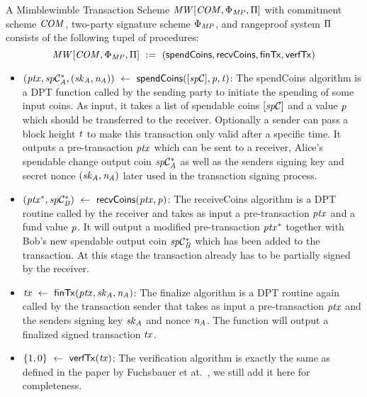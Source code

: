\begin{definition}
    \label{def:atom:mw-tx-scheme}
    A Mimblewimble Transaction Scheme $\mathit{MW}[\mathit{COM},\Phi_{\mathit{MP}},\Pi]$ with commitment scheme $\mathit{COM}$, two-party signature scheme $\Phi_{\mathit{MP}}$, and rangeproof system $\Pi$ consists of the following tupel of procedures:
    \[ \mathit{MW}[\mathit{COM},\Phi_{\mathit{MP}},\Pi] ~:=~ ( \mathsf{spendCoins},\mathsf{recvCoins},\mathsf{finTx},\mathsf{verfTx} ) \]
    \begin{itemize}
        \item $(\mathit{ptx}, \mathit{sp}\mathcal{C}_{\mathit{A}}^*, (\mathit{sk}_{\mathit{A}}, \mathit{\mathit{n}_{\mathit{A}}})) ~\leftarrow~ \mathsf{spendCoins}([\mathit{sp}\mathcal{C}],\mathit{p},\mathit{t})$: The spendCoins algorithm is a DPT function called by the sending party to initiate the spending of some input coins.
        As input, it takes a list of spendable coins $[\mathit{sp}\mathcal{C}]$ and a value $\mathit{p}$ which should be transferred to the receiver.
        Optionally a sender can pass a block height $\mathit{t}$ to make this transaction only valid after a specific time.
        It outputs a pre-transaction $\mathit{ptx}$ which can be sent to a receiver, Alice's spendable change output coin $\mathit{sp}\mathcal{C}_{\mathit{A}}^*$ as well as the senders signing key and secret nonce $(\mathit{sk}_{\mathit{A}}, \mathit{\mathit{n}_{\mathit{A}}})$ later used in the transaction signing process.
        \item $(\mathit{ptx}^*, \mathit{sp}\mathcal{C}_{\mathit{B}}^*) ~\leftarrow~ \mathsf{recvCoins}(\mathit{ptx},\mathit{p})$: The receiveCoins algorithm is a DPT routine called by the receiver and takes as input a pre-transaction $\mathit{ptx}$ and a fund value
        $\mathit{p}$.
        It will output a modified pre-transaction $\mathit{ptx}^*$ together with Bob's new spendable output coin $\mathit{sp}\mathcal{C}_{\mathit{B}}^*$ which has been added to the transaction.
        At this stage the transaction already has to be partially signed by the receiver.
        \item $\mathit{tx} ~\leftarrow~ \mathsf{finTx}(\mathit{ptx},\mathit{sk}_{\mathit{A}},\mathit{\mathit{n}_{\mathit{A}}})$: The finalize algorithm is a DPT routine again called by the transaction sender that takes as input a pre-transaction $\mathit{ptx}$ and the senders signing key $\mathit{sk}_{\mathit{A}}$ and nonce $\mathit{\mathit{n}_{\mathit{A}}}$.
        The function will output a finalized signed transaction $\mathit{tx}$.
        \item $\{1,0\} ~\leftarrow~ \mathsf{verfTx}(\mathit{tx})$: The verification algorithm is exactly the same as defined in the paper by Fuchsbauer et at.~\cite{fuchsbauer2019aggregate}, we still add it here for completeness.

\end{itemize}
\end{definition}
